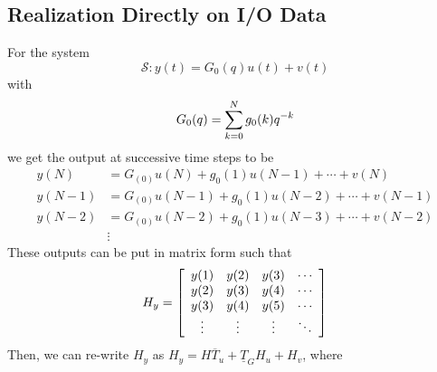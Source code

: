 \documentclass[lecture,12pt,]{pcms-l}
\begin{document}
\subsection{Realization Directly on I/O Data}
For the system
$$\mathcal{S}: y(t) = G_0(q)u(t)+v(t)$$
with
$$G_0(q)=\sum_{k=0}^N g_0(k)q^{-k}$$
we get the output at successive time steps to be
\begin{align*}
y(N) &= G_(0)u(N) + g_0(1)u(N-1) + \cdots + v(N) \\
y(N-1) &= G_(0)u(N-1) + g_0(1)u(N-2) + \cdots + v(N-1) \\
y(N-2) &= G_(0)u(N-2) + g_0(1)u(N-3) + \cdots + v(N-2) \\
&\vdots
\end{align*}
These outputs can be put in matrix form such that
\begin{align*}
H_y = \left[\begin{array}{c c c c}
y(1) & y(2) & y(3) & \cdots \\
y(2) & y(3) & y(4) & \cdots \\
y(3) & y(4) & y(5) & \cdots \\
\vdots & \vdots & \vdots & \ddots
\end{array}\right]
\end{align*}
Then, we can re-write $H_y$ as $H_y=H\overline{T}_u+\underline{T}_GH_u+H_v$, where
\end{document}
